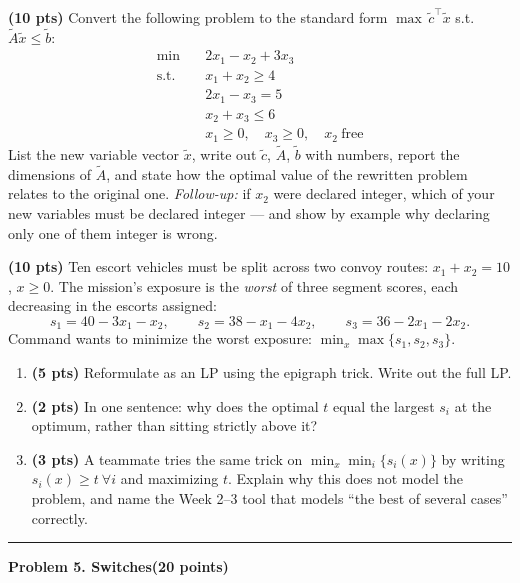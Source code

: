 \documentclass[10pt]{article}
\newcommand{\problem}[2]{%
  \par\bigskip
  {\color{ruleink}\rule{\textwidth}{1pt}}\par\nobreak\vspace{3pt}
  {\large\bfseries #2}\hfill{\normalsize\bfseries(#1 points)}\par\nobreak\vspace{4pt}}
\begin{document}
\begin{parts}
\item \textbf{(10 pts)} Convert the following problem to the standard form
  $\max\, \tilde c^{\top}\tilde x$ s.t.\ $\tilde A \tilde x \le \tilde b$:
  \[
  \begin{aligned}
    \min\quad & 2x_1 - x_2 + 3x_3 \\
    \text{s.t.}\quad & x_1 + x_2 \ge 4 \\
                     & 2x_1 - x_3 = 5 \\
                     & x_2 + x_3 \le 6 \\
                     & x_1 \ge 0, \quad x_3 \ge 0, \quad x_2 \ \text{free}
  \end{aligned}
  \]
  List the new variable vector $\tilde x$, write out $\tilde c$, $\tilde A$,
  $\tilde b$ with numbers, report the dimensions of $\tilde A$, and state how the
  optimal value of the rewritten problem relates to the original one.
  \emph{Follow-up:} if $x_2$ were declared integer, which of your new variables must
  be declared integer --- and show by example why declaring only one of them integer
  is wrong.
\item \textbf{(10 pts)} Ten escort vehicles must be split across two convoy routes:
  $x_1 + x_2 = 10$, $x \ge 0$. The mission's exposure is the \emph{worst} of three
  segment scores, each decreasing in the escorts assigned:
  \[
    s_1 = 40 - 3x_1 - x_2, \qquad
    s_2 = 38 - x_1 - 4x_2, \qquad
    s_3 = 36 - 2x_1 - 2x_2 .
  \]
  Command wants to minimize the worst exposure:
  $\min_{x} \max\{s_1, s_2, s_3\}$.
  \begin{enumerate}[label=(\roman*), leftmargin=2.2em, itemsep=2pt]
    \item \textbf{(5 pts)} Reformulate as an LP using the epigraph trick. Write out
      the full LP.
    \item \textbf{(2 pts)} In one sentence: why does the optimal $t$ equal the
      largest $s_i$ at the optimum, rather than sitting strictly above it?
    \item \textbf{(3 pts)} A teammate tries the same trick on
      $\min_x \min_i \{s_i(x)\}$ by writing $s_i(x) \ge t \ \forall i$ and
      maximizing $t$. Explain why this does not model the problem, and name the
      Week 2--3 tool that models ``the best of several cases'' correctly.
  \end{enumerate}
\end{parts}

\problem{20}{Problem 5. Switches}
\end{document}
